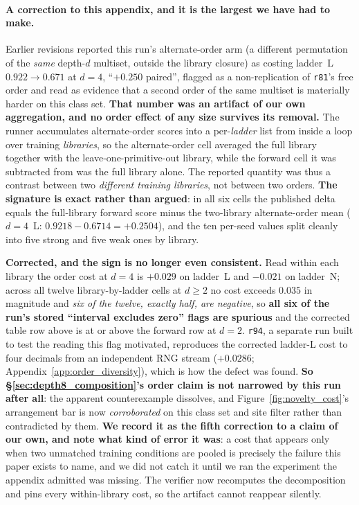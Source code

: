 \paragraph{A correction to this appendix, and it is the largest we have had to make.} Earlier revisions reported this run's alternate-order arm (a different permutation of the \emph{same} depth-$d$ multiset, outside the library closure) as costing ladder~L $0.922 \to 0.671$ at $d{=}4$, ``$+0.250$ paired'', flagged as a non-replication of \texttt{r81}'s free order and read as evidence that a second order of the same multiset is materially harder on this class set. \textbf{That number was an artifact of our own aggregation, and no order effect of any size survives its removal.} The runner accumulates alternate-order scores into a per-\emph{ladder} list from inside a loop over training \emph{libraries}, so the alternate-order cell averaged the full library together with the leave-one-primitive-out library, while the forward cell it was subtracted from was the full library alone. The reported quantity was thus a contrast between two \emph{different training libraries}, not between two orders. \textbf{The signature is exact rather than argued}: in all six cells the published delta equals the full-library forward score minus the two-library alternate-order mean ($d{=}4$~L: $0.9218 - 0.6714 = +0.2504$), and the ten per-seed values split cleanly into five strong and five weak ones by library.

\textbf{Corrected, and the sign is no longer even consistent.} Read within each library the order cost at $d{=}4$ is $+0.029$ on ladder~L and $-0.021$ on ladder~N; across all twelve library-by-ladder cells at $d{\geq}2$ no cost exceeds $0.035$ in magnitude and \emph{six of the twelve, exactly half, are negative}, so \textbf{all six of the run's stored ``interval excludes zero'' flags are spurious} and the corrected table row above is at or above the forward row at $d{=}2$. \texttt{r94}, a separate run built to test the reading this flag motivated, reproduces the corrected ladder-L cost to four decimals from an independent RNG stream ($+0.0286$; Appendix~\ref{app:order_diversity}), which is how the defect was found. \textbf{So \S\ref{sec:depth8_composition}'s order claim is not narrowed by this run after all}: the apparent counterexample dissolves, and Figure~\ref{fig:novelty_cost}'s arrangement bar is now \emph{corroborated} on this class set and site filter rather than contradicted by them. \textbf{We record it as the fifth correction to a claim of our own, and note what kind of error it was}: a cost that appears only when two unmatched training conditions are pooled is precisely the failure this paper exists to name, and we did not catch it until we ran the experiment the appendix admitted was missing. The verifier now recomputes the decomposition and pins every within-library cost, so the artifact cannot reappear silently.

